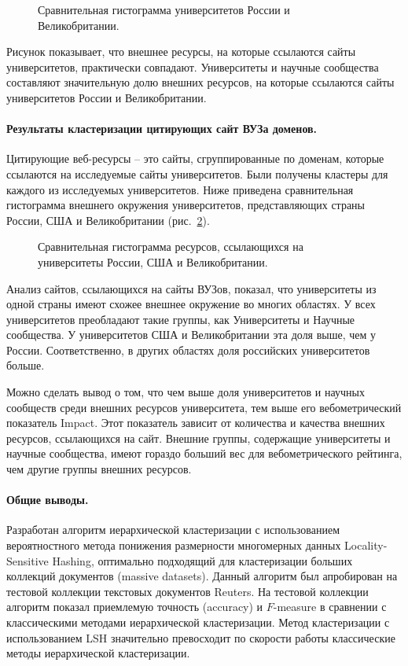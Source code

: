 \begin{figure}[ht]
	\caption{Сравнительная гистограмма университетов России и Великобритании.}\label{fig:histogramUKRU}
\end{figure}

Рисунок показывает, что внешнее ресурсы, на которые ссылаются сайты университетов, практически совпадают. Университеты и научные сообщества составляют значительную долю внешних ресурсов, на которые ссылаются сайты университетов России и Великобритании.

\paragraph{Результаты кластеризации цитирующих сайт ВУЗа доменов.} Цитирующие веб-ресурсы -- это сайты, сгруппированные по доменам, которые ссылаются на исследуемые сайты университетов. Были получены кластеры для каждого из исследуемых университетов. Ниже приведена сравнительная гистограмма внешнего окружения университетов, представляющих страны России, США и Великобритании (рис.~\cref{fig:histogramUKRUUS}).

\begin{figure}[ht]
	\caption{Сравнительная гистограмма ресурсов, ссылающихся на университеты России, США и Великобритании.}\label{fig:histogramUKRUUS}
\end{figure}

Анализ сайтов, ссылающихся на сайты ВУЗов, показал, что университеты из одной страны имеют схожее внешнее окружение во многих областях. У всех университетов преобладают такие группы, как Университеты и Научные сообщества. У университетов США и Великобритании эта доля выше, чем у России. Соответственно, в других областях доля российских университетов больше.

Можно сделать вывод о том, что чем выше доля университетов и научных сообществ среди внешних ресурсов университета, тем выше его вебометрический показатель Impact. Этот показатель зависит от количества и качества внешних ресурсов, ссылающихся на сайт. Внешние группы, содержащие университеты и научные сообщества, имеют гораздо больший вес для вебометрического рейтинга, чем другие группы внешних ресурсов.

\paragraph{Общие выводы.} Разработан алгоритм иерархической кластеризации с использованием вероятностного метода понижения размерности многомерных данных Locality-Sensitive Hashing, оптимально подходящий для кластеризации больших коллекций документов (massive datasets). Данный алгоритм был апробирован на тестовой коллекции текстовых документов Reuters. На тестовой коллекции алгоритм показал приемлемую точность (accuracy) и \(F\)-measure в сравнении с классическими методами иерархической кластеризации. Метод кластеризации с использованием LSH значительно превосходит по скорости работы классические методы иерархической кластеризации.

